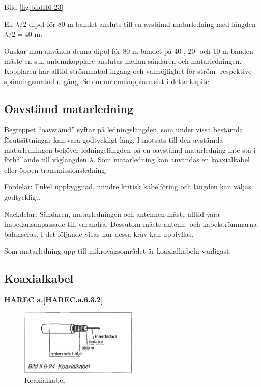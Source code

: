 Bild \ref{fig:bildII6-23}

En \(\lambda/2\)-dipol för 80 m-bandet ansluts till en avstämd
matarledning med längden \(\lambda/2 = 40\) m.

Önskar man använda denna dipol för 80 m-bandet på 40-, 20- och 10
m-banden måste en s.k. antennkopplare anslutas mellan sändaren och
matarledningen. Kopplaren har alltid strömmatad ingång och
valmöjlighet för ström- respektive spänningsmatad utgång. Se om
antennkopplare sist i detta kapitel.

\subsection{Oavstämd matarledning}

Begreppet ``oavstämd'' syftar på ledningslängden, som under vissa
bestämda förutsättningar kan vara godtyckligt lång. I motsats till den
avstämda matarledningen behöver ledningslängden på en oavstämd
matarledning inte stå i förhållande till våglängden \(\lambda\). Som
matarledning kan användas en koaxialkabel eller öppen
transmissionsledning.

Fördelar: Enkel uppbyggnad, mindre kritisk kabelföring och längden kan
väljas godtyckligt.

Nackdelar: Sändaren, matarledningen och antennen måste alltid vara
impedansanpassade till varandra. Dessutom måste antenn- och
kabelströmmarna balanseras. I det följande visas hur dessa krav kan
uppfyllas.

Som matarledning upp till mikrovågsområdet är koaxialkabeln vanligast.

\subsection{Koaxialkabel}
\textbf{
HAREC a.\ref{HAREC.a.6.3.2}\label{myHAREC.a.6.3.2}
}

\begin{figure}
  \includegraphics[width=0.5\textwidth]{images/bild_2_6-24}
  \caption{Koaxialkabel}
  \label{fig:bildII6-24}
\end{figure}

